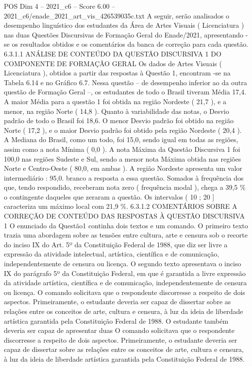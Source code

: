 \begin{textsample}{POS Dim 4 – 2021\_c6 – Score 6.00 – 2021\_c6/enade\_2021\_art\_vis\_426539035c.txt}
A seguir, serão analisados o desempenho linguístico dos estudantes da Área de Artes Visuais ( Licenciatura ) nas duas Questões Discursivas de Formação Geral do Enade/2021, apresentando -se os resultados obtidos e os comentários da banca de correção para cada questão. 6.3.1.1 ANÁLISE DE CONTEÚDO DA QUESTÃO DISCURSIVA 1 DO COMPONENTE DE FORMAÇÃO GERAL Os dados de Artes Visuais ( Licenciatura ), obtidos a partir das respostas à Questão 1, encontram -se na Tabela 6.14 e no Gráfico 6.7.
Nessa questão – de desempenho inferior ao da outra questão de Formação Geral –, os estudantes de todo o Brasil tiveram Média 17,4.
A maior Média para a questão 1 foi obtida na região Nordeste ( 21,7 ), e a menor, na região Norte ( 14,8 ).
Quanto à variabilidade das notas, o Desvio padrão de todo o Brasil foi 18,6.
O menor Desvio padrão foi obtido na região Norte ( 17,2 ), e o maior Desvio padrão foi obtido pela região Nordeste ( 20,4 ).
A Mediana do Brasil, como um todo, foi 15,0, sendo igual em todas as regiões, assim como a nota Mínima ( 0,0 ).
A nota Máxima da Questão Discursiva 1 foi 100,0 nas regiões Sudeste e Sul, sendo a menor nota Máxima obtida nas regiões Norte e Centro-Oeste ( 80,0, em ambas ).
A região Nordeste apresenta um valor intermediário : 95,0. branco a resposta a essa questão.
Somados à frequência dos que, tendo respondido, receberam nota zero ( frequência modal ), chega a 39,5 \% o contingente daqueles que zeraram a questão.
Os intervalos ( 10 ; 20 ] caracteriza um máximo local com 21,9 \%. 6.3.1.2 COMENTÁRIOS SOBRE A CORREÇÃO DE CONTEÚDO DAS RESPOSTAS À QUESTÃO DISCURSIVA 1 O enunciado da Questão1 continha dois textos e um comando.
O primeiro texto trazia uma abordagem sobre as tensões entre cultura, arte e censura sob o recorte do inciso IX do Art. 5º da Constituição Federal de 1988, que diz ser livre a expressão da atividade intelectual, artística, científica e de comunicação, independentemente de censura ou licença.
O segundo texto apresentava o inciso IX do parágrafo 5º da Constituição Federal, em que é garantida a livre expressão da atividade artística, científica e de comunicação, independentemente de censura ou licença.
O comando solicitava que o respondente discorresse a respeito de dois aspectos.
Primeiramente, o estudante deveria ser capaz de dissertar sobre as relações entre os conceitos de arte, cultura e censura, à luz da ideia de liberdade artística garantida pela Constituição Federal de 1988.
O estudante também deveria ser capaz de apresentar duas O comando solicitava que o respondente discorresse a respeito de dois aspectos.
Primeiramente, o estudante deveria ser capaz de dissertar sobre as relações entre os conceitos de arte, cultura e censura, à luz da ideia de liberdade artística garantida pela Constituição Federal de 1988.

\end{textsample}
